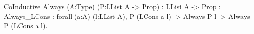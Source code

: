 CoInductive Always (A:Type) (P:LList A -> Prop) : LList A -> Prop :=
  Always_LCons :
    forall (a:A) (l:LList A), P (LCons a l) -> 
                              Always P l  -> 
                              Always P (LCons a l).
